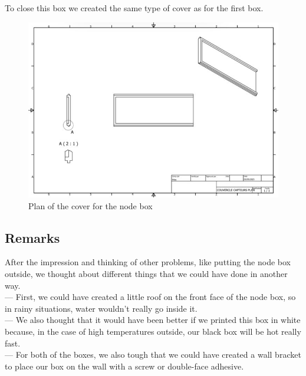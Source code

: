 To close this box we created the same type of cover as for the first box.
\begin{figure}[H]
    \centering
    \includegraphics[width=.7\textwidth]{images/casing/img46.jpg}
    \caption{Plan of the cover for the node box}
\end{figure}

\subsection{Remarks}
After the impression and thinking of other problems, like putting the node box outside, we thought about different things that we could have done in another way. \\
--- First, we could have created a little roof on the front face of the node box, so in rainy situations, water wouldn’t really go inside it. \\
--- We also thought that it would have been better if we printed this box in white because, in the case of high temperatures outside, our black box will be hot really fast. \\
--- For both of the boxes, we also tough that we could have created a wall bracket to place our box on the wall with a screw or double-face adhesive.